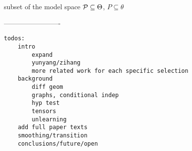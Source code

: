 



subset of the model space $\mathcal{P} \subseteq \Theta$, $P \subseteq \theta$

-------------------------

\begin{verbatim}
todos:
    intro
        expand
        yunyang/zihang
        more related work for each specific selection
    background
        diff geom
        graphs, conditional indep
        hyp test
        tensors
        unlearning
    add full paper texts
    smoothing/transition
    conclusions/future/open
\end{verbatim}

